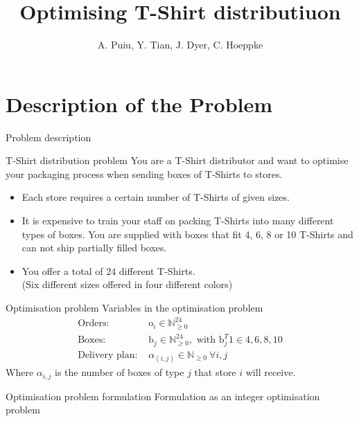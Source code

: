 \documentclass{beamer}
\title[T-Shirt Problem]{Optimising T-Shirt distributiuon} %
\author{A. Puiu, Y. Tian, J. Dyer, C. Hoeppke} %
\institute[University of Oxford] %
{
\textit{Department for Mathematics} %
\date{\today} %
}
\newcommand{\N}{\mathbb{N}}
\begin{document}
\begin{frame}
\titlepage %
\end{frame}

\section{Description of the Problem}


\begin{frame}{Problem description}
    \begin{block}{T-Shirt distribution problem}
        You are a T-Shirt distributor and want to optimise your packaging
        process when sending boxes of T-Shirts to stores.
        \begin{itemize}
            \item Each store requires a
            certain number of T-Shirts of given sizes.
            \item It is expensive to train your staff on packing T-Shirts into many
            different types of boxes. You are supplied with boxes that fit 4, 6, 8
            or 10 T-Shirts and can not ship partially filled boxes.
            \item You offer a total of $24$ different T-Shirts.\\
                \hfill(Six different sizes offered in four different colors)
        \end{itemize}
    \end{block}
\end{frame}

\begin{frame}{Optimisation problem}
    Variables in the optimisation problem
    \begin{align*}
        \text{Orders: }& \text{o}_i \in \N_{\geq 0}^{24}\\
        \text{Boxes: }& \text{b}_j \in \N_{\geq 0}^{24}, \text{ with }
        \text{b}_j^T 1 \in {4, 6, 8, 10}\\
        \text{Delivery plan: }& \alpha_{(i,j)}\in \N_{\geq 0}~ \forall i, j
    \end{align*}
    Where $\alpha_{i,j}$ is the number of boxes of type $j$ that store $i$ will
    receive.\\
\end{frame}

\begin{frame}{Optimisation problem formulation}
    Formulation as an integer optimisation problem
    \begin{align*}

    \end{align*}
\end{frame}
\end{document}
